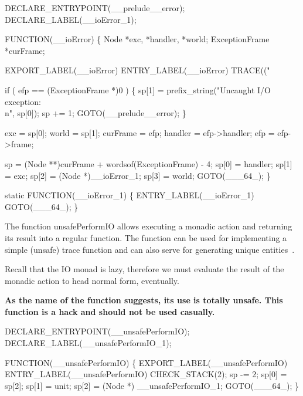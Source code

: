 \nwenddocs{}\plusendmoddef\nwstartdeflinemarkup{}\nwenddeflinemarkup
DECLARE_ENTRYPOINT(__prelude__error);
DECLARE_LABEL(__ioError_1);

FUNCTION(__ioError)
\{
    Node           *exc, *handler, *world;
    ExceptionFrame *curFrame;

    EXPORT_LABEL(__ioError)
 ENTRY_LABEL(__ioError)
    TRACE(("%

    if ( efp == (ExceptionFrame *)0 )
    \{
        sp[1] = prefix_string("Uncaught I/O exception:\\n", sp[0]);
        sp   += 1;
        GOTO(__prelude__error);
    \}

    exc      = sp[0];
    world    = sp[1];
    curFrame = efp;
    handler  = efp->handler;
    efp      = efp->frame;

    sp    = (Node **)curFrame + wordsof(ExceptionFrame) - 4;
    sp[0] = handler;
    sp[1] = exc;
    sp[2] = (Node *)__ioError_1;
    sp[3] = world;
    GOTO(___64_);
\}

static
FUNCTION(__ioError_1)
\{
 ENTRY_LABEL(__ioError_1)
    GOTO(___64_);
\}

\nwendcode{}\nwdocspar
The function {\Tt{}unsafePerformIO\nwendquote} allows executing a monadic action
and returning its result into a regular function. The function can be
used for implementing a simple (unsafe) trace function and can also
serve for generating unique entities~\cite{AugustssonRittriSynek94:Unique}.

Recall that the IO monad is lazy, therefore we must evaluate the result
of the monadic action to head normal form, eventually.

\textbf{As the name of the function suggests, its use is totally
unsafe. This function is a hack and should not be used casually.}

\nwenddocs{}\plusendmoddef\nwstartdeflinemarkup{}\nwenddeflinemarkup
DECLARE_ENTRYPOINT(__unsafePerformIO);
DECLARE_LABEL(__unsafePerformIO_1);

FUNCTION(__unsafePerformIO)
\{
    EXPORT_LABEL(__unsafePerformIO)
 ENTRY_LABEL(__unsafePerformIO)
    CHECK_STACK(2);
    sp   -= 2;
    sp[0] = sp[2];
    sp[1] = unit;
    sp[2] = (Node *) __unsafePerformIO_1;
    GOTO(___64_);
\}

